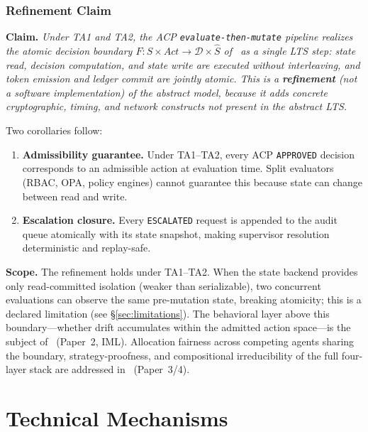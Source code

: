 \documentclass[11pt]{article}
\theoremstyle{definition}
\begin{document}
\subsubsection*{Refinement Claim}

\textbf{Claim.}
\emph{Under TA1 and TA2, the ACP \texttt{evaluate-then-mutate} pipeline
realizes the atomic decision boundary $F : S \times \mathit{Act} \to
\mathcal{D} \times \hat{S}$ of~\cite{fernandez2026a} as a single LTS step:
state read, decision computation, and state write are executed without
interleaving, and token emission and ledger commit are jointly atomic.
This is a \textbf{refinement} (not a software implementation) of the abstract
model, because it adds concrete cryptographic, timing, and network constructs
not present in the abstract LTS.}

Two corollaries follow:
\begin{enumerate}[noitemsep]
  \item \textbf{Admissibility guarantee.}
        Under TA1--TA2, every ACP \texttt{APPROVED} decision corresponds to
        an admissible action at evaluation time.  Split evaluators (RBAC,
        OPA, policy engines) cannot guarantee this because state can change
        between read and write.
  \item \textbf{Escalation closure.}
        Every \texttt{ESCALATED} request is appended to the audit queue
        atomically with its state snapshot, making supervisor resolution
        deterministic and replay-safe.
\end{enumerate}

\textbf{Scope.}
The refinement holds under TA1--TA2.  When the state backend provides only
read-committed isolation (weaker than serializable), two concurrent evaluations
can observe the same pre-mutation state, breaking atomicity; this is a declared
limitation (see \S\ref{sec:limitations}).  The behavioral layer above this
boundary---whether drift accumulates within the admitted action space---is the
subject of~\cite{fernandez2026c} (Paper~2, IML).  Allocation fairness across
competing agents sharing the boundary, strategy-proofness, and compositional
irreducibility of the full four-layer stack are addressed
in~\cite{fernandez2026govstr} (Paper~3/4).

\section{Technical Mechanisms}
\end{document}
